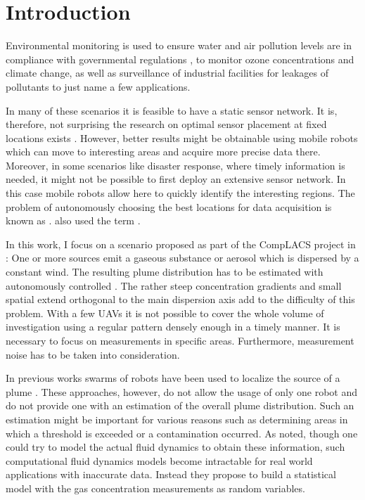 \chapter{Introduction}
Environmental monitoring is used to ensure water and air pollution levels are in
compliance with governmental regulations \parencite[i.\,e.][]{Anonymous:1996ui}, 
to monitor ozone concentrations and climate change,  as well as surveillance of 
industrial facilities for leakages of pollutants to just name a few 
applications.

In many of these scenarios it is feasible to have a static sensor network.  It 
is, therefore, not surprising the research on optimal sensor placement at fixed 
locations exists \parencite[e.\,g.][]{Osborne:2008hi, Guestrin:2005cq, Wang:kz}.  
However, better results might be obtainable using mobile robots which can move 
to interesting areas and acquire more precise data there. Moreover, in some 
scenarios like disaster response, where timely information is needed, it might 
not be possible to first deploy an extensive sensor network. In this case mobile 
robots allow here to quickly identify the interesting regions. The problem of 
autonomously choosing the best locations for data acquisition is known as 
. \textcite{Marchant:2012wb} also used the term 
.

In this work, I focus on a scenario proposed as part of the CompLACS project in 
\textcite{denardi2013rn}: One or more sources emit a gaseous substance or 
aerosol which is dispersed by a constant wind. The resulting plume distribution 
has to be estimated with autonomously controlled . The rather steep concentration gradients and small spatial 
extend orthogonal to the main dispersion axis add to the difficulty of this 
problem.  With a few UAVs it is not possible to cover the whole volume of 
investigation using a regular pattern densely enough in a timely manner.  It is 
necessary to focus on measurements in specific areas.  Furthermore, measurement 
noise has to be taken into consideration.

In previous works swarms of robots have been used to localize the source of 
a plume \parencite{Jatmiko:2007df, Zarzhitsky:2005tz}. These approaches, 
however, do not allow the usage of only one robot and do not provide one with an 
estimation of the overall plume distribution. Such an estimation might be 
important for various reasons such as determining areas in which a threshold is 
exceeded or a contamination occurred. As \textcite{Reggente:2009ti} noted, 
though one could try to model the actual fluid dynamics to obtain these 
information, such computational fluid dynamics models become intractable for 
real world applications with inaccurate data.  Instead they propose to build 
a statistical model with the gas concentration measurements as random variables.

